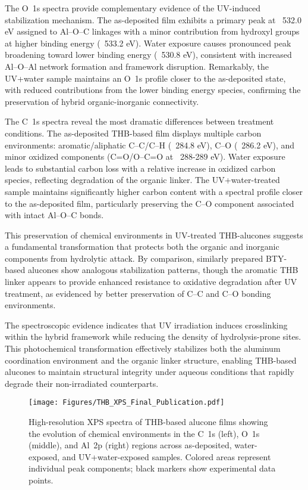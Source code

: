 The O~1s spectra provide complementary evidence of the UV-induced stabilization mechanism. The as-deposited film exhibits a primary peak at ~532.0 eV assigned to Al–O–C linkages with a minor contribution from hydroxyl groups at higher binding energy (~533.2 eV). Water exposure causes pronounced peak broadening toward lower binding energy (~530.8 eV), consistent with increased Al–O–Al network formation and framework disruption. Remarkably, the UV+water sample maintains an O~1s profile closer to the as-deposited state, with reduced contributions from the lower binding energy species, confirming the preservation of hybrid organic-inorganic connectivity.

The C~1s spectra reveal the most dramatic differences between treatment conditions. The as-deposited THB-based film displays multiple carbon environments: aromatic/aliphatic C–C/C–H (~284.8 eV), C–O (~286.2 eV), and minor oxidized components (C=O/O–C=O at ~288-289 eV). Water exposure leads to substantial carbon loss with a relative increase in oxidized carbon species, reflecting degradation of the organic linker. The UV+water-treated sample maintains significantly higher carbon content with a spectral profile closer to the as-deposited film, particularly preserving the C–O component associated with intact Al–O–C bonds.

This preservation of chemical environments in UV-treated THB-alucones suggests a fundamental transformation that protects both the organic and inorganic components from hydrolytic attack. By comparison, similarly prepared BTY-based alucones show analogous stabilization patterns, though the aromatic THB linker appears to provide enhanced resistance to oxidative degradation after UV treatment, as evidenced by better preservation of C–C and C–O bonding environments.

The spectroscopic evidence indicates that UV irradiation induces crosslinking within the hybrid framework while reducing the density of hydrolysis-prone sites. This photochemical transformation effectively stabilizes both the aluminum coordination environment and the organic linker structure, enabling THB-based alucones to maintain structural integrity under aqueous conditions that rapidly degrade their non-irradiated counterparts.

\begin{figure}[H]
  \centering
  \texttt{[image: Figures/THB\_XPS\_Final\_Publication.pdf]}
  \caption{High-resolution XPS spectra of THB-based alucone films showing the evolution of chemical environments in the C~1s (left), O~1s (middle), and Al~2p (right) regions across as-deposited, water-exposed, and UV+water-exposed samples. Colored areas represent individual peak components; black markers show experimental data points.}
  \label{fig:xps_spectra}
\end{figure}


